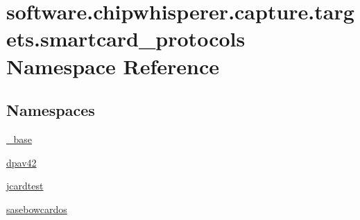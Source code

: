 \hypertarget{namespacesoftware_1_1chipwhisperer_1_1capture_1_1targets_1_1smartcard__protocols}{}\section{software.\+chipwhisperer.\+capture.\+targets.\+smartcard\+\_\+protocols Namespace Reference}
\label{namespacesoftware_1_1chipwhisperer_1_1capture_1_1targets_1_1smartcard__protocols}
\subsection*{Namespaces}
\begin{DoxyCompactItemize}
\item 
 \hyperlink{namespacesoftware_1_1chipwhisperer_1_1capture_1_1targets_1_1smartcard__protocols_1_1__base}{\+\_\+base}
\item 
 \hyperlink{namespacesoftware_1_1chipwhisperer_1_1capture_1_1targets_1_1smartcard__protocols_1_1dpav42}{dpav42}
\item 
 \hyperlink{namespacesoftware_1_1chipwhisperer_1_1capture_1_1targets_1_1smartcard__protocols_1_1jcardtest}{jcardtest}
\item 
 \hyperlink{namespacesoftware_1_1chipwhisperer_1_1capture_1_1targets_1_1smartcard__protocols_1_1sasebowcardos}{sasebowcardos}
\end{DoxyCompactItemize}
